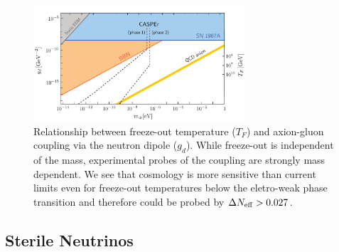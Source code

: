 \begin{figure}[h!]
\centering \includegraphics[width=0.70\textwidth]{Neutrinos/DipoleWithCASPErAndBBN.pdf}
\caption{Relationship between freeze-out temperature ($T_F$) and axion-gluon coupling via the neutron dipole ($g_d$).  While freeze-out is independent of the mass, experimental probes of the coupling are strongly mass dependent. We see that cosmology is more sensitive than current limits even for freeze-out temperatures below the eletro-weak phase transition and therefore could be probed by $\Delta N_{\rm eff} > 0.027$.   }
\label{fig:axiondipole}
\end{figure}




\subsection{Sterile Neutrinos}
\label{sec:sterile_neutrinos}

